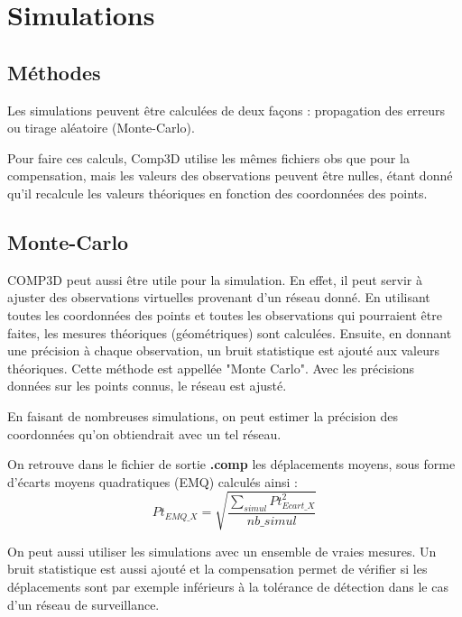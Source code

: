 \documentclass[french]{report}
\begin{document}
\chapter{Simulations}

\section{Méthodes}
Les simulations peuvent être calculées de deux façons : propagation des erreurs ou
tirage aléatoire (Monte-Carlo).

Pour faire ces calculs, Comp3D utilise les mêmes fichiers obs que pour la compensation, mais les
valeurs des observations peuvent être nulles, étant donné qu'il recalcule les valeurs théoriques en
fonction des coordonnées des points.

\section{Monte-Carlo}
COMP3D peut aussi être utile pour la simulation. En effet, il peut servir à ajuster des observations virtuelles provenant d'un
réseau donné. En utilisant toutes les coordonnées des points et toutes les observations qui pourraient être faites,
les mesures théoriques (géométriques) sont calculées. Ensuite, en donnant une précision à chaque observation,
un bruit statistique est ajouté aux valeurs théoriques. Cette méthode est appellée "Monte Carlo".
Avec les précisions données sur les points connus, le réseau est ajusté.

En faisant de nombreuses simulations, on peut estimer la précision des coordonnées qu'on obtiendrait avec un tel réseau.


On retrouve dans le fichier de sortie \textbf{.comp} les déplacements moyens, sous forme d'écarts
moyens quadratiques (EMQ) calculés ainsi :
$$Pt_{EMQ\_X} =  \sqrt{\frac {\sum_{simul} Pt_{Ecart\_X}^2}{nb\_simul} } $$


On peut aussi utiliser les simulations avec un ensemble de vraies mesures. Un bruit statistique est aussi ajouté et la compensation
permet de vérifier si les déplacements sont par exemple inférieurs à la tolérance de détection dans le cas d'un réseau de surveillance.
\end{document}
